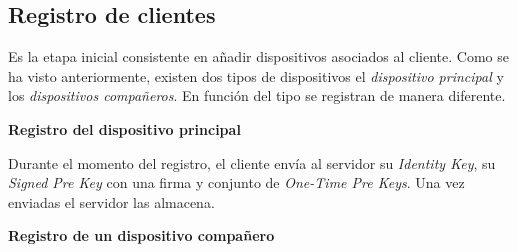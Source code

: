 \subsection{Registro de clientes}
Es la etapa inicial consistente en añadir dispositivos asociados al cliente. Como se ha visto anteriormente, existen dos tipos de dispositivos el \emph{dispositivo principal} y los \emph{dispositivos compañeros}. En función del tipo se registran de manera diferente.
\begin{description}
	\item \textbf{Registro del dispositivo principal}

	Durante el momento del registro, el cliente envía al servidor su \emph{Identity Key}, su \emph{Signed Pre Key} con una firma y conjunto de \emph{One-Time Pre Keys}. Una vez enviadas el servidor las almacena.

	\item \textbf{Registro de un dispositivo compañero}


\end{description}
